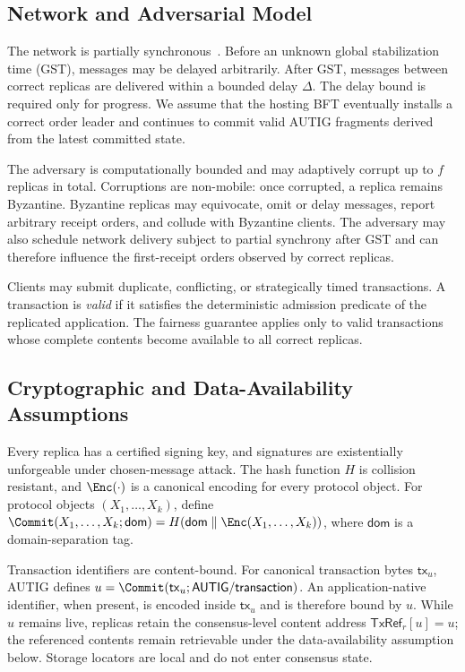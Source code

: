 \subsection{Network and Adversarial Model}
\label{sec:network-adversary}

The network is partially synchronous~\cite{dwork1988consensus}.  Before an
unknown global stabilization time (GST), messages may be delayed arbitrarily.
After GST, messages between correct replicas are delivered within a bounded
delay $\Delta$.  The delay bound is required only for progress. 
We assume that the hosting BFT eventually installs a correct order leader
and continues to commit valid AUTIG fragments derived from the latest committed
state.

The adversary is computationally bounded and may adaptively corrupt up to $f$
replicas in total.  Corruptions are non-mobile: once corrupted, a replica
remains Byzantine.  Byzantine replicas may equivocate, omit or delay messages,
report arbitrary receipt orders, and collude with Byzantine clients.  The
adversary may also schedule network delivery subject to partial synchrony after
GST and can therefore influence the first-receipt orders observed by correct
replicas.

Clients may submit duplicate, conflicting, or strategically timed
transactions.  A transaction is \emph{valid} if it satisfies the deterministic
admission predicate of the replicated application.  The fairness guarantee
applies only to valid transactions whose complete contents become available
to all correct replicas.

\subsection{Cryptographic and Data-Availability Assumptions}
\label{sec:cryptographic-assumptions}

Every replica has a certified signing key, and signatures are existentially
unforgeable under chosen-message attack.  The hash function $H$ is collision
resistant, and $\Enc(\cdot)$ is a canonical encoding for every protocol object.
For protocol objects $(X_1,\ldots,X_k)$, define
$\Commit(X_1,\ldots,X_k;\mathsf{dom})
=H(\mathsf{dom}\parallel\Enc(X_1,\ldots,X_k))$, where $\mathsf{dom}$ is a
domain-separation tag.

Transaction identifiers are content-bound.  For canonical transaction bytes
$\mathsf{tx}_u$, AUTIG defines
$u=\Commit(\mathsf{tx}_u;\mathsf{AUTIG/transaction})$.  An application-native
identifier, when present, is encoded inside $\mathsf{tx}_u$ and is therefore
bound by $u$.  While $u$ remains live, replicas retain the consensus-level
content address $\mathsf{TxRef}_r[u]=u$; the referenced contents remain
retrievable under the data-availability assumption below.  Storage locators
are local and do not enter consensus state.

